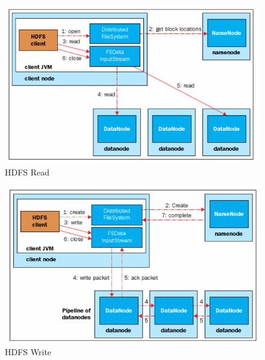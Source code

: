 \documentclass[sigconf]{acmart}
\begin{document}
\begin{figure}[!ht]
  \centering\includegraphics[width=\columnwidth]{images/hdfsRead.PNG}
  \caption{HDFS Read \cite[Ch.\ 3, p. 38]{AchariShiva2015HE}}\label{f:hdfs-read}
\end{figure}

\begin{figure}[!ht]
  \centering\includegraphics[width=\columnwidth]{images/hdfsWrite.PNG}
  \caption{HDFS Write \cite[Ch.\ 3, p. 39]{AchariShiva2015HE}}\label{f:hdfs-write}
\end{figure}
\end{document}
